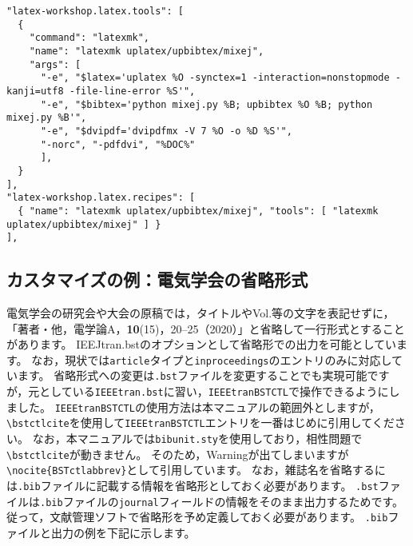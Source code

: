 \documentclass[10pt, a4paper, dvipdfmx, uplatex]{jsarticle} %
\renewcommand{\refname}{\small 参考文献}
\newcommand{\putlst}[1]{
  \noindent\makebox[\linewidth]{\rule{\linewidth}{0.4pt}}\vspace{-1.5zw}
  \vspace{-1.8zw}
  \noindent\makebox[\linewidth]{\rule{\linewidth}{0.4pt}}\vspace{0.5zw}\par
}
\begin{document}
\noindent\makebox[\linewidth]{\rule{\linewidth}{0.4pt}}\vspace{-0.5zw}
\begin{lstlisting}[style=onecol]
"latex-workshop.latex.tools": [
  {
    "command": "latexmk",
    "name": "latexmk uplatex/upbibtex/mixej",
    "args": [
      "-e", "$latex='uplatex %O -synctex=1 -interaction=nonstopmode -kanji=utf8 -file-line-error %S'",
      "-e", "$bibtex='python mixej.py %B; upbibtex %O %B; python mixej.py %B'",
      "-e", "$dvipdf='dvipdfmx -V 7 %O -o %D %S'",
      "-norc", "-pdfdvi", "%DOC%"
      ],
  }
],
"latex-workshop.latex.recipes": [
  { "name": "latexmk uplatex/upbibtex/mixej", "tools": [ "latexmk uplatex/upbibtex/mixej" ] }
],
\end{lstlisting}\vspace{-1.8zw}
\noindent\makebox[\linewidth]{\rule{\linewidth}{0.4pt}}\vspace{0.5zw}\par


\subsection{カスタマイズの例：電気学会の省略形式}

電気学会の研究会や大会の原稿では，タイトルやVol.等の文字を表記せずに，「著者・他，電学論A，\textbf{10}(15)，20--25（2020）」と省略して一行形式とすることがあります。
IEEJtran.bstのオプションとして省略形での出力を可能としています。
なお，現状では\texttt{article}タイプと\texttt{inproceedings}のエントリのみに対応しています。
省略形式への変更は\texttt{.bst}ファイルを変更することでも実現可能ですが，元としている\texttt{IEEEtran.bst}に習い，\texttt{IEEEtranBSTCTL}で操作できるようにしました。
\texttt{IEEEtranBSTCTL}の使用方法は本マニュアルの範囲外としますが，\texttt{\textbackslash bstctlcite}を使用して\texttt{IEEEtranBSTCTL}エントリを一番はじめに引用してください。
なお，本マニュアルでは\texttt{bibunit.sty}を使用しており，相性問題で\texttt{\textbackslash bstctlcite}が動きません。
そのため，Warningが出てしまいますが\texttt{\textbackslash nocite\{BSTctlabbrev\}}として引用しています。
なお，雑誌名を省略するには\texttt{.bib}ファイルに記載する情報を省略形としておく必要があります。
\texttt{.bst}ファイルは\texttt{.bib}ファイルの\texttt{journal}フィールドの情報をそのまま出力するためです。
従って，文献管理ソフトで省略形を予め定義しておく必要があります。
\texttt{.bib}ファイルと出力の例を下記に示します。

\putlst{articleabbrev.bib}

\begin{bibunit}[IEEJtran]
  \nocite{BSTctlabbrev}
  \nocite{jpArticle1,jpArticle2,jpArticle3,enArticle1,enArticle2,enArticle3,jpInproceedings1,jpInproceedings2,enInproceedings1,enInproceedings2}
  \renewcommand{\refname}{\small 参考文献(IEEJtran.bst)}
  {\small \putbib[./articleabbrev]}
\end{bibunit}
\end{document}

